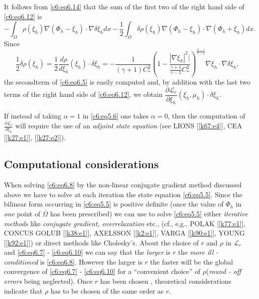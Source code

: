 It follows from \eqref{c6:eq6.14} that the sum of the first two of the 
right hand side of \eqref{c6:eq6.12} is  
\begin{equation}
-\int_\Omega \rho(\xi_h) \nabla (\Phi_h- \xi_h) \cdot 
\nabla \delta \xi_h dx - \frac{1}{2} \int_\Omega \delta \rho 
(\xi_h) \nabla (\Phi_h - \xi_h) \cdot \nabla(\Phi_h + 
\xi_h) dx.\tag{6.15}\label{c6:eq6.15}   
\end{equation}
Since 
\begin{equation}
\frac{1}{2} \delta \rho (\xi_h) = \frac{1}{2} \frac{d \rho}{d 
\xi_h}(\xi_h)\cdot \delta \xi_h = - \frac{1}{(\gamma+1) C^2_*} \left(1- 
\frac{|\nabla \xi_h|^2|}{\frac{\gamma + 1}{\gamma 
-1}C^2_*}\right)^{\frac{2- \gamma}{\gamma -1}} \nabla \xi_h \cdot \nabla 
\delta\xi_h, \tag{6.16}\label{c6:eq6.16}    
\end{equation}
the second\pageoriginale  term of \eqref{c6:eq6.5} is easily computed
and, by addition  
with the last two terms of the right hand side of \eqref{c6:eq6.12}, we 
obtain $\dfrac{\partial \mathscr{L}_r}{\partial \xi_h} (\xi_h, \mu_h) 
\cdot \delta \xi_h$.   

\begin{remark}\label{c6:rem6.2}%
If instead of taking $\alpha = 1$ in \eqref{c6:eq5.6} one takes $\alpha 
=0$, then the computation of $\frac{\partial \mathscr{L}_r}{\partial 
\xi_h}$ will require the use of an {\em adjoint state equation} (see 
LIONS [\ref{k67:e4}], CEA [\ref{k27:e1}], [\ref{k27:e2}]).   
\end{remark}

\subsection{Computational considerations}\label{c6:ss6.4}%

When solving \eqref{c6:eq6.8} by the non-linear conjugate gradient 
method discussed above we have to solve at each iteration the state 
equation \eqref{c6:eq5.5}. Since the bilinear form occurring in 
\eqref{c6:eq5.5} is positive definite (once the value of $\Phi_h$ in 
\textit{one} point of $\overline{\Omega}$ has been prescribed) we can 
use to solve \eqref{c6:eq5.5} either \textit{iterative methods} like 
\textit{conjugate gradient, overrelaxation} etc., (cf., e,g., POLAK 
[\ref{k77:e1}], CONCUS GOLUB [\ref{k38:e1}], AXELSSON [\ref{k2:e1}],
VARGA [\ref{k90:e1}], YOUNG [\ref{k92:e1}]) or direct 
methods like Cholesky's. About the choice of $r$ and $\rho$ in 
$\mathscr{L}_r$ and \eqref{c6:eq6.7} - \eqref{c6:eq6.10} we can say 
that  the \textit{larger } is $r$ the \textit{more ill - conditioned} 
is \eqref{c6:eq6.8}. However the larger is $r$ the faster will be the 
global convergence of \eqref{c6:eq6.7} - \eqref{c6:eq6.10} for a 
``convenient choice'' of $\rho$(\textit{round - off errors } being 
neglected). Once $r$ has been chosen , theoretical considerations 
indicate that $\rho$ has to be chosen of  the same order as $r$.        
         

